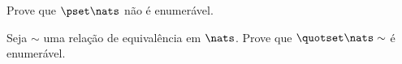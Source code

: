 \begin{exercise}
Prove que $\pset \nats$ não é enumerável.
\end{exercise}

\begin{exercise}
Seja $\sim$ uma relação de equivalência em $\nats$. Prove que $\quotset \nats \sim $ é enumerável.
\end{exercise}